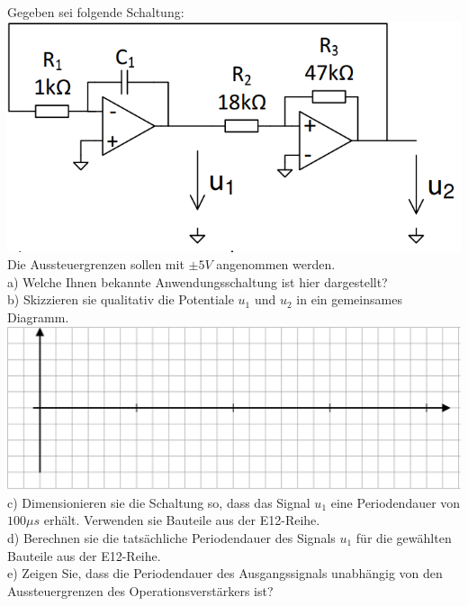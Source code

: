 \documentclass[A4]{scrreprt}
\begin{document}
  Gegeben sei folgende Schaltung:\\
  \includegraphics{Schaltung14.png}\\
  Die Aussteuergrenzen sollen mit $\pm 5V$ angenommen werden.\\
  a) Welche Ihnen bekannte Anwendungsschaltung ist hier dargestellt?\\
  b) Skizzieren sie qualitativ die Potentiale $u_1$ und $u_2$ in ein gemeinsames Diagramm.\\
  \includegraphics{pot_dia.png}\\
  c) Dimensionieren sie die Schaltung so, dass das Signal $u_1$ eine Periodendauer von $100 \mu s$ erhält. Verwenden sie Bauteile aus der E12-Reihe.\\
  d) Berechnen sie die tatsächliche Periodendauer des Signals $u_1$ für die gewählten Bauteile aus der E12-Reihe.\\
  e) Zeigen Sie, dass die Periodendauer des Ausgangssignals unabhängig von den Aussteuergrenzen des Operationsverstärkers ist?\\
\end{document}
